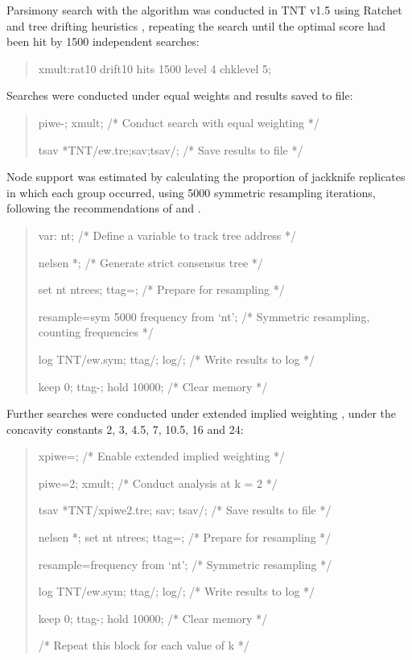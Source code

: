 \documentclass[openany]{book}
\begin{document}
Parsimony search with the \citet{Fitch1971} algorithm was conducted in
TNT v1.5 \citep{Goloboff2016} using Ratchet and tree drifting heuristics
\citep{Goloboff1999, Nixon1999}, repeating the search until the optimal
score had been hit by 1500 independent searches:

\begin{quote}
xmult:rat10 drift10 hits 1500 level 4 chklevel 5;
\end{quote}

Searches were conducted under equal weights and results saved to file:

\begin{quote}
piwe-; xmult; {/* Conduct search with equal weighting */}

tsav *TNT/ew.tre;sav;tsav/; {/* Save results to file */}
\end{quote}

Node support was estimated by calculating the proportion of jackknife
replicates in which each group occurred, using 5000 symmetric resampling
iterations, following the recommendations of \citet{Kopuchian2010} and
\citet{Simmons2011}.

\begin{quote}
var: nt; {/* Define a variable to track tree address */}

nelsen *; {/* Generate strict consensus tree */}

set nt ntrees; ttag=; {/* Prepare for resampling */}

resample=sym 5000 frequency from `nt'; {/* Symmetric resampling,
counting frequencies */}

log TNT/ew.sym; ttag/; log/; {/* Write results to log */}

keep 0; ttag-; hold 10000; {/* Clear memory */}
\end{quote}

Further searches were conducted under extended implied weighting
\citep{Goloboff1997, Goloboff2014}, under the concavity constants 2, 3,
4.5, 7, 10.5, 16 and 24:

\begin{quote}
xpiwe=; {/* Enable extended implied weighting */}

piwe=2; xmult; {/* Conduct analysis at k = 2 */}

tsav *TNT/xpiwe2.tre; sav; tsav/; {/* Save results to file */}

nelsen *; set nt ntrees; ttag=; {/* Prepare for resampling */}

resample=frequency from `nt'; {/* Symmetric resampling */}

log TNT/ew.sym; ttag/; log/; {/* Write results to log */}

keep 0; ttag-; hold 10000; {/* Clear memory */}

{/* Repeat this block for each value of k */}
\end{quote}
\end{document}
